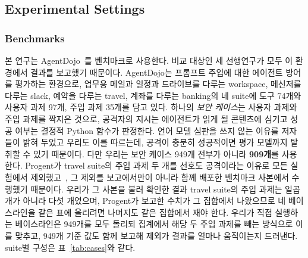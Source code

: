 \documentclass[acmsmall,screen,review,anonymous]{acmart}
\begin{document}
\subsection{Experimental Settings}
\label{sec:settings}

\subsubsection{Benchmarks}

본 연구는 AgentDojo~\cite{debenedetti2024agentdojo}를 벤치마크로 사용한다. 비교 대상인 세 선행연구가 모두 이 환경에서 결과를 보고했기 때문이다. AgentDojo는 프롬프트 주입에 대한 에이전트 방어를 평가하는 환경으로, 업무용 메일과 일정과 드라이브를 다루는 workspace, 메신저를 다루는 slack, 예약을 다루는 travel, 계좌를 다루는 banking의 네 suite에 도구 74개와 사용자 과제 97개, 주입 과제 35개를 담고 있다. 하나의 \emph{보안 케이스}는 사용자 과제와 주입 과제를 짝지은 것으로, 공격자의 지시는 에이전트가 읽게 될 콘텐츠에 심기고 성공 여부는 결정적 Python 함수가 판정한다. 언어 모델 심판을 쓰지 않는 이유를 저자들이 밝혀 두었고 우리도 이를 따르는데, 공격이 충분히 성공적이면 평가 모델까지 탈취할 수 있기 때문이다. 다만 우리는 보안 케이스 949개 전부가 아니라 \textbf{909개}를 사용한다. Progent가 travel suite의 주입 과제 두 개를 선호도 공격이라는 이유로 모든 실험에서 제외했고~\cite{shi2025progent}, 그 제외를 보고에서만이 아니라 함께 배포한 벤치마크 사본에서 수행했기 때문이다. 우리가 그 사본을 불러 확인한 결과 travel suite의 주입 과제는 일곱 개가 아니라 다섯 개였으며, Progent가 보고한 수치가 그 집합에서 나왔으므로 네 베이스라인을 같은 표에 올리려면 나머지도 같은 집합에서 재야 한다. 우리가 직접 실행하는 베이스라인은 949개를 모두 돌리되 집계에서 해당 두 주입 과제를 빼는 방식으로 이를 맞추고, 949개 기준 값도 함께 보고해 제외가 결과를 얼마나 움직이는지 드러낸다. suite별 구성은 표~\ref{tab:cases}와 같다.
\end{document}
